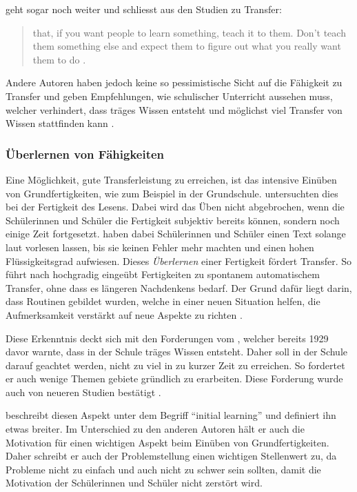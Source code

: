 \citeauthor{Detterman1993} geht sogar noch weiter und schliesst aus den Studien zu Transfer:
\begin{quote}
that, if you want people to learn something, teach it to them. Don't teach them something else and expect them to figure out what you really want them to do \citep[S. 21]{Detterman1993}.
\end{quote}

Andere Autoren haben jedoch keine so pessimistische Sicht auf die Fähigkeit zu Transfer und geben Empfehlungen, wie schulischer Unterricht aussehen muss, welcher verhindert, dass träges Wissen entsteht und möglichst viel Transfer von Wissen stattfinden kann \citep[Kapitel 3]{Bransford2000}.


\subsubsection{Überlernen von Fähigkeiten}
Eine Möglichkeit, gute Transferleistung zu erreichen, ist das intensive Einüben von Grundfertigkeiten, wie zum Beispiel in der Grundschule. \citet{LaBerge1974} untersuchten dies bei der Fertigkeit des Lesens. Dabei wird das Üben nicht abgebrochen, wenn die Schülerinnen und Schüler die Fertigkeit subjektiv bereits können, sondern noch einige Zeit fortgesetzt. \citeauthor{LaBerge1974} haben dabei Schülerinnen und Schüler einen Text solange laut vorlesen lassen, bis sie keinen Fehler mehr machten und einen hohen Flüssigkeitsgrad aufwiesen. Dieses \textit{Überlernen} einer Fertigkeit fördert Transfer. So führt nach \citet{Perkins1989} hochgradig eingeübt Fertigkeiten zu spontanem automatischem Transfer, ohne dass es längeren Nachdenkens bedarf. Der Grund dafür liegt darin, dass Routinen gebildet wurden, welche in einer neuen Situation helfen, die Aufmerksamkeit verstärkt auf neue Aspekte zu richten \citep{LaBerge1974, Mietzel2007}.

Diese Erkenntnis deckt sich mit den Forderungen vom \citet{Whitehead1929}, welcher bereits 1929 davor warnte, dass in der Schule träges Wissen entsteht. Daher soll in der Schule darauf geachtet werden, nicht zu viel in zu kurzer Zeit zu erreichen. So fordertet er auch wenige Themen gebiete gründlich zu erarbeiten. Diese Forderung wurde auch von neueren Studien bestätigt \citep{Porter1989,Brophy1992a,Millar1999}. 

\citet{Bransford2000} beschreibt diesen Aspekt unter dem Begriff "`initial learning"' und definiert ihn etwas breiter.  Im Unterschied zu den anderen Autoren hält er auch die Motivation für einen wichtigen Aspekt beim Einüben von Grundfertigkeiten. Daher schreibt er auch der Problemstellung einen wichtigen Stellenwert zu, da Probleme nicht zu einfach und auch nicht zu schwer sein sollten, damit die Motivation der Schülerinnen und Schüler nicht zerstört wird.

